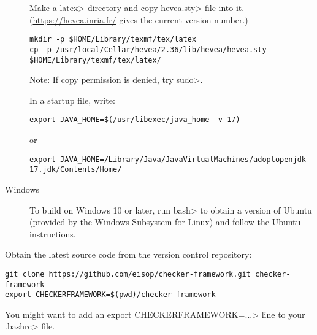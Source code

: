 \begin{description}
Make a \<latex> directory and copy \<hevea.sty> file into it.
(\url{https://hevea.inria.fr/} gives the current version number.)

\begin{Verbatim}
mkdir -p $HOME/Library/texmf/tex/latex
cp -p /usr/local/Cellar/hevea/2.36/lib/hevea/hevea.sty $HOME/Library/texmf/tex/latex/
\end{Verbatim}

Note: If copy permission is denied, try \<sudo>.

In a startup file, write:

\begin{Verbatim}
export JAVA_HOME=$(/usr/libexec/java_home -v 17)
\end{Verbatim}
or
\begin{Verbatim}
export JAVA_HOME=/Library/Java/JavaVirtualMachines/adoptopenjdk-17.jdk/Contents/Home/
\end{Verbatim}


\item[Windows]
  To build on Windows 10 or later,
  run \<bash> to obtain a version of
  Ubuntu (provided by the Windows Subsystem for Linux) and follow the Ubuntu
  instructions.


\end{description}



Obtain the latest source code from the version control repository:

\begin{Verbatim}
git clone https://github.com/eisop/checker-framework.git checker-framework
export CHECKERFRAMEWORK=$(pwd)/checker-framework
\end{Verbatim}

You might want to add an \<export CHECKERFRAMEWORK=...> line to your
\<.bashrc> file.




